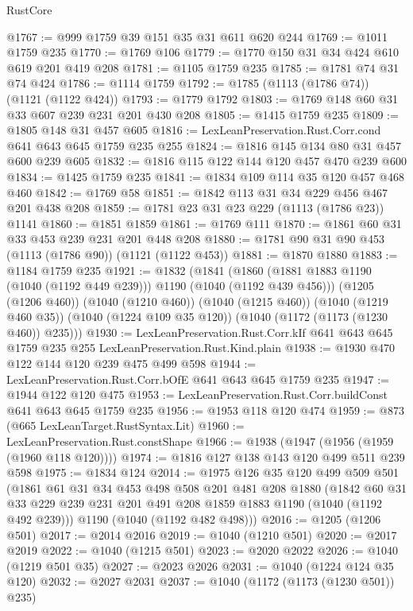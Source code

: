 \begin{lexlean}{RustCore}
\begin{coremodule}
@1767 := @999 @1759 @39 @151 @35 @31 @611 @620 @244
@1769 := @1011 @1759 @235
@1770 := @1769 @106
@1779 := @1770 @150 @31 @34 @424 @610 @619 @201 @419 @208
@1781 := @1105 @1759 @235
@1785 := @1781 @74 @31 @74 @424
@1786 := @1114 @1759
@1792 := @1785 (@1113 (@1786 @74)) (@1121 (@1122 @424))
@1793 := @1779 @1792
@1803 := @1769 @148 @60 @31 @33 @607 @239 @231 @201 @430 @208
@1805 := @1415 @1759 @235
@1809 := @1805 @148 @31 @457 @605
@1816 := LexLeanPreservation.Rust.Corr.cond @641 @643 @645 @1759 @235 @255
@1824 := @1816 @145 @134 @80 @31 @457 @600 @239 @605
@1832 := @1816 @115 @122 @144 @120 @457 @470 @239 @600
@1834 := @1425 @1759 @235
@1841 := @1834 @109 @114 @35 @120 @457 @468 @460
@1842 := @1769 @58
@1851 := @1842 @113 @31 @34 @229 @456 @467 @201 @438 @208
@1859 := @1781 @23 @31 @23 @229 (@1113 (@1786 @23)) @1141
@1860 := @1851 @1859
@1861 := @1769 @111
@1870 := @1861 @60 @31 @33 @453 @239 @231 @201 @448 @208
@1880 := @1781 @90 @31 @90 @453 (@1113 (@1786 @90)) (@1121 (@1122 @453))
@1881 := @1870 @1880
@1883 := @1184 @1759 @235
@1921 := @1832
    (@1841
      (@1860 (@1881 @1883 @1190 (@1040 (@1192 @449 @239))) @1190 (@1040 (@1192 @439 @456)))
      (@1205 (@1206 @460))
      (@1040 (@1210 @460))
      (@1040 (@1215 @460))
      (@1040 (@1219 @460 @35))
      (@1040 (@1224 @109 @35 @120))
      (@1040 (@1172 (@1173 (@1230 @460)) @235)))
@1930 := LexLeanPreservation.Rust.Corr.kIf
    @641
    @643
    @645
    @1759
    @235
    @255
    LexLeanPreservation.Rust.Kind.plain
@1938 := @1930 @470 @122 @144 @120 @239 @475 @499 @598
@1944 := LexLeanPreservation.Rust.Corr.bOfE @641 @643 @645 @1759 @235
@1947 := @1944 @122 @120 @475
@1953 := LexLeanPreservation.Rust.Corr.buildConst @641 @643 @645 @1759 @235
@1956 := @1953 @118 @120 @474
@1959 := @873 (@665 LexLeanTarget.RustSyntax.Lit)
@1960 := LexLeanPreservation.Rust.constShape
@1966 := @1938 (@1947 (@1956 (@1959 (@1960 @118 @120))))
@1974 := @1816 @127 @138 @143 @120 @499 @511 @239 @598
@1975 := @1834 @124
@2014 := @1975
    @126
    @35
    @120
    @499
    @509
    @501
    (@1861
      @61
      @31
      @34
      @453
      @498
      @508
      @201
      @481
      @208
      @1880
      (@1842 @60 @31 @33 @229 @239 @231 @201 @491 @208 @1859 @1883 @1190 (@1040 (@1192 @492 @239)))
      @1190
      (@1040 (@1192 @482 @498)))
@2016 := @1205 (@1206 @501)
@2017 := @2014 @2016
@2019 := @1040 (@1210 @501)
@2020 := @2017 @2019
@2022 := @1040 (@1215 @501)
@2023 := @2020 @2022
@2026 := @1040 (@1219 @501 @35)
@2027 := @2023 @2026
@2031 := @1040 (@1224 @124 @35 @120)
@2032 := @2027 @2031
@2037 := @1040 (@1172 (@1173 (@1230 @501)) @235)

\end{coremodule}
\end{lexlean}
